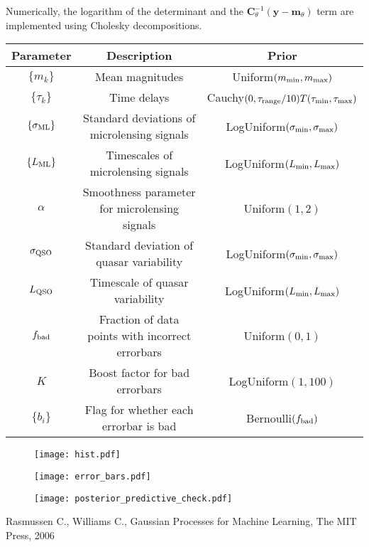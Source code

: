 \documentclass[a4paper, 10pt]{article}
\newcommand{\yy}{\mathbf{y}}
\newcommand{\mm}{\mathbf{m}_\theta}
\newcommand{\CC}{\mathbf{C}_\theta}
\begin{document}
Numerically, the logarithm of the determinant and the
$\CC^{-1}\left(\yy - \mm\right)$ term are implemented using
Cholesky decompositions.

\begin{table}[h!]
\begin{center}
\begin{tabular}{|c|c|c|}
\hline
Parameter & Description & Prior\\
\hline
$\{m_k\}$ & Mean magnitudes & Uniform$(m_{\rm min}, m_{\rm max})$\\
$\{\tau_k\}$ & Time delays & Cauchy$(0, \tau_{\rm range}/10)T(\tau_{\rm min}, \tau_{\rm max})$\\
$\{\sigma_{\rm ML}\}$ & Standard deviations of microlensing signals & LogUniform$(\sigma_{\rm min}, \sigma_{\rm max})$\\
$\{L_{\rm ML}\}$ & Timescales of microlensing signals & LogUniform$(L_{\rm min}, L_{\rm max})$\\
$\alpha$ & Smoothness parameter for microlensing signals & Uniform$(1,2)$\\
$\sigma_{\rm QSO}$ & Standard deviation of quasar variability & LogUniform$(\sigma_{\rm min}, \sigma_{\rm max})$\\
$L_{\rm QSO}$ & Timescale of quasar variability & LogUniform$(L_{\rm min}, L_{\rm max})$\\
$f_{\rm bad}$ & Fraction of data points with incorrect errorbars & Uniform$(0,1)$\\
$K$ & Boost factor for bad errorbars & LogUniform$(1, 100)$\\
$\{b_i\}$ & Flag for whether each errorbar is bad & Bernoulli$(f_{\rm bad})$\\
\hline
\end{tabular}
\end{center}
\end{table}

\begin{figure}
\begin{center}
\texttt{[image: hist.pdf]}
\end{center}
\end{figure}


\begin{figure}
\begin{center}
\texttt{[image: error\_bars.pdf]}
\end{center}
\end{figure}


\begin{figure}
\begin{center}
\texttt{[image: posterior\_predictive\_check.pdf]}
\end{center}
\end{figure}

\begin{thebibliography}{99} 
 Rasmussen C., Williams C., Gaussian Processes for Machine Learning, The MIT Press, 2006
\end{thebibliography}
\end{document}
